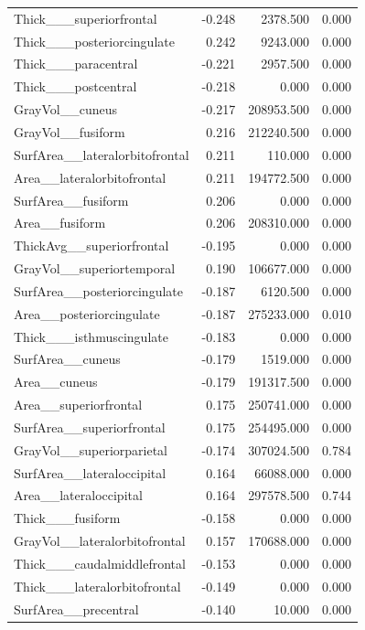 \documentclass{article}
\begin{document}
\begin{longtable}{lrrr}
	Thick\_\_\_superiorfrontal & -0.248 & 2378.500 & 0.000 \\
	Thick\_\_\_posteriorcingulate & 0.242 & 9243.000 & 0.000 \\
	Thick\_\_\_paracentral & -0.221 & 2957.500 & 0.000 \\
	Thick\_\_\_postcentral & -0.218 & 0.000 & 0.000 \\
	GrayVol\_\_cuneus & -0.217 & 208953.500 & 0.000 \\
	GrayVol\_\_fusiform & 0.216 & 212240.500 & 0.000 \\
	SurfArea\_\_lateralorbitofrontal & 0.211 & 110.000 & 0.000 \\
	Area\_\_lateralorbitofrontal & 0.211 & 194772.500 & 0.000 \\
	SurfArea\_\_fusiform & 0.206 & 0.000 & 0.000 \\
	Area\_\_fusiform & 0.206 & 208310.000 & 0.000 \\
	ThickAvg\_\_superiorfrontal & -0.195 & 0.000 & 0.000 \\
	GrayVol\_\_superiortemporal & 0.190 & 106677.000 & 0.000 \\
	SurfArea\_\_posteriorcingulate & -0.187 & 6120.500 & 0.000 \\
	Area\_\_posteriorcingulate & -0.187 & 275233.000 & 0.010 \\
	Thick\_\_\_isthmuscingulate & -0.183 & 0.000 & 0.000 \\
	SurfArea\_\_cuneus & -0.179 & 1519.000 & 0.000 \\
	Area\_\_cuneus & -0.179 & 191317.500 & 0.000 \\
	Area\_\_superiorfrontal & 0.175 & 250741.000 & 0.000 \\
	SurfArea\_\_superiorfrontal & 0.175 & 254495.000 & 0.000 \\
	GrayVol\_\_superiorparietal & -0.174 & 307024.500 & 0.784 \\
	SurfArea\_\_lateraloccipital & 0.164 & 66088.000 & 0.000 \\
	Area\_\_lateraloccipital & 0.164 & 297578.500 & 0.744 \\
	Thick\_\_\_fusiform & -0.158 & 0.000 & 0.000 \\
	GrayVol\_\_lateralorbitofrontal & 0.157 & 170688.000 & 0.000 \\
	Thick\_\_\_caudalmiddlefrontal & -0.153 & 0.000 & 0.000 \\
	Thick\_\_\_lateralorbitofrontal & -0.149 & 0.000 & 0.000 \\
	SurfArea\_\_precentral & -0.140 & 10.000 & 0.000 \\

\end{longtable}
\end{document}
